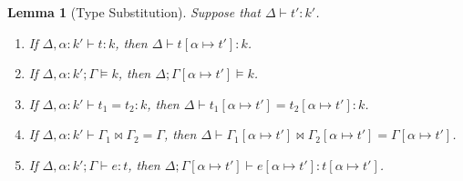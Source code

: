 \documentclass{article}
\newcommand{\TASS}[1]{#1\colon\!}
\newcommand{\TVAR}{\alpha}
\newcommand{\KENV}{\Delta}
\newcommand{\TENV}{\Gamma}
\newcommand{\SPLIT}[3]{#1 \Join #2 = #3}
\newtheorem{lemma}{Lemma}
\begin{document}
\begin{lemma}[Type Substitution]\label{lemma:type-substitution}
  Suppose that $\KENV \vdash t' : k'$.
  \begin{enumerate}
  \item\label{item:1} If $\KENV, \TASS\TVAR {k'} \vdash t : k$, then
    $\KENV \vdash t[\TVAR \mapsto t'] : k$.
  \item\label{item:3} If $\KENV, \TASS\TVAR {k'}; \TENV \models k$,
    then $\KENV; \TENV[\TVAR \mapsto t'] \models k$.
  \item\label{item:5} If $\KENV, \TASS\TVAR {k'} \vdash t_1 = t_2 : k$,
    then $\KENV \vdash t_1[\TVAR \mapsto t'] = t_2[\TVAR \mapsto t'] : k$.
  \item\label{item:4} If
    $\KENV, \TASS\TVAR {k'} \vdash \SPLIT{\TENV_1}{\TENV_2}{\TENV}$,
    then $\KENV \vdash \SPLIT{\TENV_1[\TVAR \mapsto t']}{\TENV_2[\TVAR \mapsto t']}{\TENV[\TVAR \mapsto t']}$.
  \item\label{item:2} If $\KENV, \TASS\TVAR {k'}; \TENV \vdash e : t$, then
    $\KENV; \TENV[\TVAR \mapsto t'] \vdash e[\TVAR \mapsto t'] : t[\TVAR \mapsto t']$.
  \end{enumerate}
\end{lemma}
\end{document}
